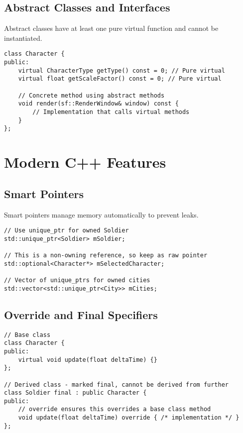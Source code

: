 \documentclass{article}
\begin{document}
\subsection{Abstract Classes and Interfaces}

Abstract classes have at least one pure virtual function and cannot be instantiated.

\begin{lstlisting}[caption=Abstract Class Example]
class Character {
public:
    virtual CharacterType getType() const = 0; // Pure virtual
    virtual float getScaleFactor() const = 0; // Pure virtual
    
    // Concrete method using abstract methods
    void render(sf::RenderWindow& window) const {
        // Implementation that calls virtual methods
    }
};
\end{lstlisting}

\section{Modern C++ Features}

\subsection{Smart Pointers}

Smart pointers manage memory automatically to prevent leaks.

\begin{lstlisting}[caption=Smart Pointers Example (Game.h)]
// Use unique_ptr for owned Soldier
std::unique_ptr<Soldier> mSoldier;

// This is a non-owning reference, so keep as raw pointer
std::optional<Character*> mSelectedCharacter;

// Vector of unique_ptrs for owned cities
std::vector<std::unique_ptr<City>> mCities;
\end{lstlisting}

\subsection{Override and Final Specifiers}

\begin{lstlisting}[caption=Override and Final Example]
// Base class
class Character {
public:
    virtual void update(float deltaTime) {}
};

// Derived class - marked final, cannot be derived from further
class Soldier final : public Character {
public:
    // override ensures this overrides a base class method
    void update(float deltaTime) override { /* implementation */ }
};
\end{lstlisting}
\end{document}
